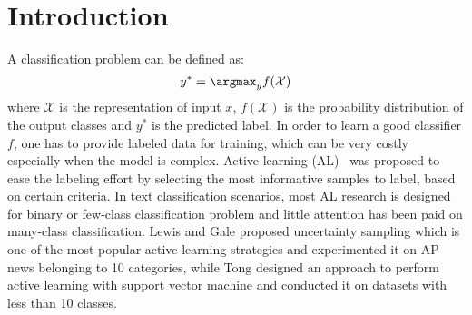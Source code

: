 \section{Introduction}
\label{sec:intro}

%
A classification problem can be defined as:
\[y^* = \argmax_y f(\mathcal{X})\] 
where $\mathcal{X}$ is 
the representation of input $x$, 
$f(\mathcal{X})$ is the probability distribution of the output classes
and $y^*$ is the predicted label. In order to learn a good classifier $f$,
one has to provide labeled data for training, which can be very costly
especially when the model is complex.  
Active learning (AL)~\cite{settles2009active} was proposed to ease the 
labeling effort by selecting the most informative samples to label, 
based on certain criteria. In text classification scenarios, most AL research is designed for 
binary or few-class classification problem 
and little attention has been paid on many-class classification. Lewis and Gale  proposed uncertainty sampling which is one of the most popular active learning strategies and experimented it on AP news belonging to 10 categories, while Tong  designed an approach to perform active learning with support vector machine and conducted it on datasets 
with less than 10 classes. 

